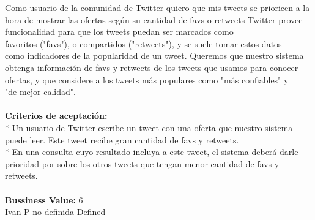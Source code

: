 	{Como usuario de la comunidad de Twitter quiero que mis tweets se prioricen a la hora de mostrar las ofertas según su cantidad de favs o retweets} %
	{Twitter provee funcionalidad para que los tweets puedan ser marcados como\\
favoritos ("favs"), o compartidos ("retweets"), y se suele tomar estos datos\\
como indicadores de la popularidad de un tweet. Queremos que nuestro sistema\\
obtenga información de favs y retweets de los tweets que usamos para conocer\\
ofertas, y que considere a los tweets más populares como "más confiables" y\\
"de mejor calidad".\\
  \\
\textbf{Criterios de aceptación:}\\
* Un usuario de Twitter escribe un tweet con una oferta que nuestro sistema puede leer. Este tweet recibe gran cantidad de favs y retweets.  \\
* En una consulta cuyo resultado incluya a este tweet, el sistema deberá darle prioridad por sobre los otros tweets que tengan menor cantidad de favs y retweets. \\
  \\
\textbf{Bussiness Value:} 6\\
} %
	{} %
	{} %
	{Ivan P} %
	{no definida} %
	{Defined} %


\vspace{20pt}


